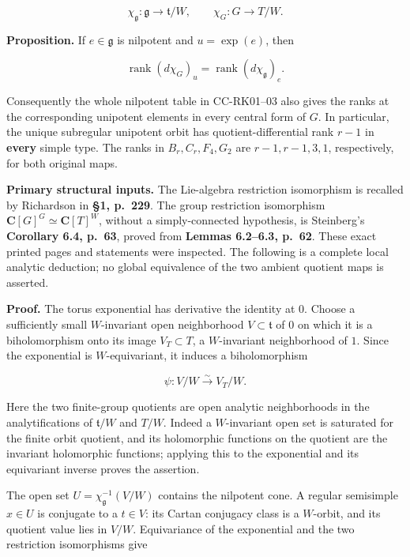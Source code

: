 \[
 \chi_{\mathfrak g}:\mathfrak g\longrightarrow\mathfrak t/W,
 \qquad
 \chi_G:G\longrightarrow T/W.
\]

\textbf{Proposition.} If \(e\in\mathfrak g\) is nilpotent and \(u=\exp(e)\), then

\[
 \operatorname{rank}(d\chi_G)_u
       =\operatorname{rank}(d\chi_{\mathfrak g})_e.
 \tag{CC-RK.4}
\]

Consequently the whole nilpotent table in CC-RK01--03 also gives the ranks at the corresponding unipotent elements in every central form of \(G\). In particular, the unique subregular unipotent orbit has quotient-differential rank \(r-1\) in \textbf{every} simple type. The ranks in \(B_r,C_r,F_4,G_2\) are \(r-1,r-1,3,1\), respectively, for both original maps.

\textbf{Primary structural inputs.} The Lie-algebra restriction isomorphism is recalled by Richardson in \textbf{§1, p.~229}. The group restriction isomorphism
\(\mathbf C[G]^G\simeq\mathbf C[T]^W\), without a simply-connected hypothesis, is Steinberg's \textbf{Corollary 6.4, p.~63}, proved from \textbf{Lemmas 6.2--6.3, p.~62}. These exact printed pages and statements were inspected. The following is a complete local analytic deduction; no global equivalence of the two ambient quotient maps is asserted.

\textbf{Proof.} The torus exponential has derivative the identity at \(0\). Choose a sufficiently small \(W\)-invariant open neighborhood \(V\subset\mathfrak t\) of \(0\) on which it is a biholomorphism onto its image \(V_T\subset T\), a \(W\)-invariant neighborhood of \(1\). Since the exponential is \(W\)-equivariant, it induces a biholomorphism

\[
 \psi:V/W\xrightarrow{\sim}V_T/W.
 \tag{CC-RK.5}
\]

Here the two finite-group quotients are open analytic neighborhoods in the analytifications of \(\mathfrak t/W\) and \(T/W\). Indeed a \(W\)-invariant open set is saturated for the finite orbit quotient, and its holomorphic functions on the quotient are the invariant holomorphic functions; applying this to the exponential and its equivariant inverse proves the assertion.

The open set \(U=\chi_{\mathfrak g}^{-1}(V/W)\) contains the nilpotent cone. A regular semisimple \(x\in U\) is conjugate to a \(t\in V\): its Cartan conjugacy class is a \(W\)-orbit, and its quotient value lies in \(V/W\). Equivariance of the exponential and the two restriction isomorphisms give

